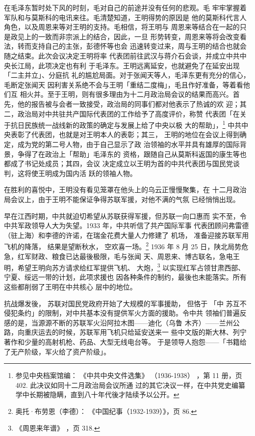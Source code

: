在毛泽东暂时处下风的时刻，毛对自己的前途并没有任何的悲观。毛
牢牢掌握着军队和与莫斯科的电讯来往。毛清楚知道，王明得势的原因是
他的莫斯科代言人角色，以及周恩来等对王明的支持。毛相信，将王明与
周恩来等结合在一起的只是政见上的一致而非宗派上的结合，因此，一旦
形势转变，周恩来等将会改变看法，转而支持自己的主张，彭德怀等也会
迅速转变过来，周与王明的结合也就会随之结束。此次会议决定王明将率
代表团前往武汉与蒋介石会谈，并成立中共中央长江局，此项决定也有利
于毛泽东。王明远离延安，也就避免了在延安出现「二主并立」、分庭抗
礼的尴尬局面。对于张闻天等人，毛泽东更有充分的信心，毛断定张闻天
因利害关系绝不会与王明「重结二度梅」，毛且作好准备，等着看他们互
相火并。至于王明，则有很多理由为十二月政治局会议的结果而高兴。首
先，他的报告被与会者一致接受，政治局的同事们都对他表示了热诚的欢
迎；其二，政治局对中共驻共产国际代表团的工作给予了高度评价，称赞
代表团「在关于抗日民族统一战线新的政策的确定与发展上给了中央以极
大的帮助」，\footnote{参见中央档案馆编：
《中共中央文件选集》
（1936-1938）
，第 11 册，页 402. 此决议如同十二月政治局会议所通
过的其它决议一样，在中共党史编纂学中长期被隐瞒，直到八十年代後才陆续予以公开。}
中共中央表彰了代表团，也就是对王明本人的表彰；其三，
王明的地位在会议上得到确定，成为党的第二号人物，由于自己显示了政
治领袖的水平并具有雄厚的国际背景，争得了在政治上「帮助」毛泽东的
资格，跟随自己从莫斯科返国的康生等也都成了书记处成员；其四，会议
决定成立以王明为首的中共代表团与国民党谈判，这将使王明成为国内活
跃的领袖人物。

在胜利的喜悦中，王明没有看见笼罩在他头上的乌云正慢慢聚集，在
十二月政治局会议上，由于王明不能保证争得苏联军援，对他不满的气氛
已经悄悄出现。

早在江西时期，中共就迫切希望从苏联获得军援，但苏联一向口惠而
实不至，令中共军政领导人大为失望。1933 年，中共听信了共产国际军事
代表团顾问弗雷德（驻上海）和李德的许诺，在瑞金花费大量人力修建了
机场，
准备迎接苏联军用飞机的降落，
结果是望断秋水，
空欢喜一场。\footnote{奥托·布劳恩（李德）：
《中国纪事（1932-1939）》，页 86.} 1936
年 8 月 25 日，陕北局势危急，红军财政、粮食已达最後极限，毛与张闻
天、周恩来、博古联名，急电王明，希望王明向苏方请求给红军提供飞机、
大炮，\footnote{《周恩来年谱》
，页 318.} 以实现红军占领甘肃西部、宁夏、绥远一带的计划，此项求援也
因各种条件的制约，最後也未能落实。所有这些都削弱了王明在中共核心
层中的地位。

抗战爆发後，
苏联对国民党政府开始了大规模的军事援助，
但恪于
「中 苏互不侵犯条约」的限制，对中共基本没有提供军火方面的援助。令中共
领袖们普遍反感的是，当源源不断的苏联军火沿阿拉木图——迪化（乌鲁
木齐）——兰州公路，向重庆运去的时候，苏联军用飞机只给延安送来一
些中文版的斯大林、列宁著作和少量的高射机枪、药品、大型无线电台等。
于是领导人抱怨——「书籍给了无产阶级，军火给了资产阶级」。

